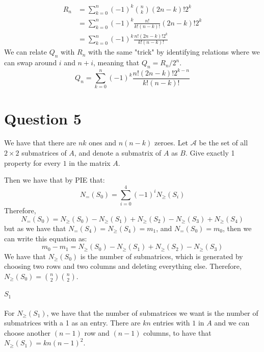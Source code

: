 \documentclass[]{article}
\begin{document}
\begin{align*}
	R_n &=  \sum_{k = 0}^n (-1)^k \binom{n}{k} (2n - k)!2^k\\ 
	&=  \sum_{k = 0}^n (-1)^k \frac{n!}{k! (n - k)!} (2n - k)!2^k\\
	&= \sum_{k = 0}^n (-1)^k \frac{n!(2n - k)! 2^k}{k! (n - k)!}
\end{align*}
We can relate $Q_n$ with $R_n$ with the same "trick" by identifying relations where we can swap around $i$ and $n+ i$, meaning that $Q_n = R_n/2^n$. 
\begin{equation}
	Q_n = \sum_{k = 0}^n (-1)^k \frac{n!(2n - k)! 2^{k - n}}{k! (n - k)!}
\end{equation}
\section{Question 5}
We have that there are $nk$ ones and $n(n-k)$ zeroes. 
Let $\mathcal{A}$ be the set of all $2 \times 2$ submatrices of $A$, and denote a submatrix of $A$ as $B$. Give exactly 1 property for every $1$ in the matrix $A$. 

Then we have that by PIE that:
\begin{equation}
	N_{=}(S_0) = \sum_{i= 0}^4 (-1)^{i} N_{\geq}(S_i) 
\end{equation}
Therefore, 
\begin{equation}
	N_{=}(S_0) = N_{\geq}(S_0) - N_{\geq}(S_1) + N_{\geq}(S_2) - N_{\geq}(S_3) + N_{\geq}(S_4)    
\end{equation}
but as we have that $N_{=}(S_4) = N_{\geq}(S_4) = m_1$, and $N_{=}(S_0) = m_0$, then we can write this equation as:
\begin{equation}
	m_0 - m_1 = N_{\geq}(S_0) - N_{\geq}(S_1) + N_{\geq}(S_2) - N_{\geq}(S_3)    
\end{equation}
We have that $N_{\geq}(S_0)$ is the number of submatrices, which is generated by choosing two rows and two columns and deleting everything else. Therefore, $N_{\geq}(S_0) = \binom{n}{2}\binom{n}{2}$.
\paragraph{$S_1$}
For $N_{\geq}(S_1)$, we have that the number of submatrices we want is the number of submatrices with a 1 as an entry. There are $kn$ entries with $1$ in $A$ and we can choose another $(n-1)$ row and $(n-1)$ columns, to have that $N_{\geq}(S_1) = kn(n-1)^2$.
\end{document}
